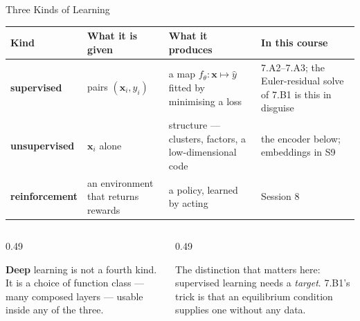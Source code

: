 \begin{frame}{Three Kinds of Learning}
\begin{center}\footnotesize
\begin{tabularx}{\linewidth}{@{}>{\raggedright\arraybackslash}p{2.1cm} >{\raggedright\arraybackslash}p{3.3cm} >{\raggedright\arraybackslash}X >{\raggedright\arraybackslash}p{2.9cm}@{}}
\toprule
\textbf{Kind} & \textbf{What it is given} & \textbf{What it produces} & \textbf{In this course} \\
\midrule
\textbf{supervised} & pairs $(\mathbf{x}_i,y_i)$ & a map $f_\theta:\mathbf{x}\mapsto\hat y$ fitted by minimising a loss & 7.A2--7.A3; the Euler-residual solve of 7.B1 is this in disguise \\
\textbf{unsupervised} & $\mathbf{x}_i$ alone & structure --- clusters, factors, a low-dimensional code & the encoder below; embeddings in S9 \\
\textbf{reinforcement} & an environment that returns rewards & a policy, learned by acting & Session 8 \\
\bottomrule
\end{tabularx}
\end{center}
\medskip
\begin{columns}[T]
\begin{column}{0.49\textwidth}
\begin{conceptbox}\footnotesize
\textbf{Deep} learning is not a fourth kind. It is a choice of function class --- many composed layers --- usable inside any of the three.
\end{conceptbox}
\end{column}
\begin{column}{0.49\textwidth}
\begin{examplebox}\footnotesize
The distinction that matters here: supervised learning needs a \emph{target}. 7.B1's trick is that an equilibrium condition supplies one without any data.
\end{examplebox}
\end{column}
\end{columns}
\end{frame}

